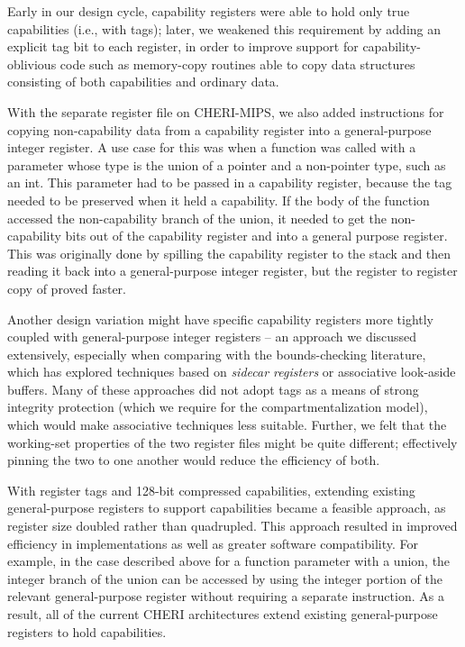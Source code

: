 Early in our design cycle, capability registers were able to hold only true
capabilities (i.e., with tags); later, we weakened this requirement by adding
an explicit tag bit to each register, in order to improve support for
capability-oblivious code such as memory-copy routines able to copy data
structures consisting of both capabilities and ordinary data.

With the separate register file on CHERI-MIPS, we also added
instructions for copying non-capability data from a capability register
into a general-purpose integer register. A use case for this was when a function was called
with a parameter whose type is the union of a pointer and a non-pointer type,
such as an int. This parameter had to be passed in a capability register, because
the tag needed to be preserved when it held a capability. If the body of
the function accessed the non-capability branch of the union, it needed to
get the non-capability bits out of the capability register and into a general
purpose register. This was originally done by spilling the capability register to the
stack and then reading it back into a general-purpose integer register, but the register
to register copy of  proved faster.

Another design variation might have specific capability registers
more tightly coupled with general-purpose integer registers -- an approach we discussed
extensively, especially when comparing with the bounds-checking literature,
which has explored techniques based on {\em sidecar registers} or associative
look-aside buffers.
Many of these approaches did not adopt tags as a means of strong integrity
protection (which we require for the compartmentalization model), which
would make associative techniques less suitable.
Further, we felt that the working-set properties of the two register files
might be quite different; effectively pinning the two to one another would
reduce the efficiency of both.

With register tags and 128-bit compressed capabilities, extending
existing general-purpose registers to support capabilities became a
feasible approach, as register size doubled rather than quadrupled.
This approach resulted in improved efficiency in implementations as
well as greater software compatibility.  For example, in the case
described above for a function parameter with a union, the integer
branch of the union can be accessed by using the integer portion of
the relevant general-purpose register without requiring a separate
instruction.  As a result, all of the current CHERI architectures
extend existing general-purpose registers to hold capabilities.

